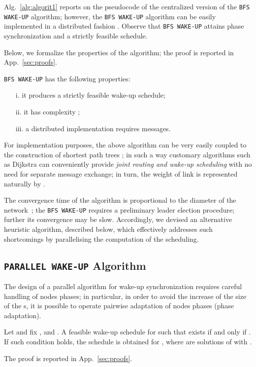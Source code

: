 Alg.~\ref{alg:algorit1} reports on the pseudocode of the centralized version of the {\tt BFS WAKE-UP} algorithm;  
however, the {\tt BFS WAKE-UP} algorithm can be easily implemented in a distributed fashion \cite{Cormen}. Observe that {\tt BFS WAKE-UP} 
attains phase synchronization and a strictly feasible schedule. 

 Below, we formalize the properties of the algorithm; the proof is reported in App.~\ref{sec:proofs}.
\begin{thm}\label{thm:BFS}
{\tt BFS WAKE-UP} has the following properties:
\begin{enumerate}
\item[  i.] it produces a strictly feasible wake-up schedule; 
\item[ ii.] it has complexity ; 
\item[iii.] a distributed implementation requires  messages.
\end{enumerate}
\end{thm}


\begin{rem}
 For implementation purposes, the above algorithm can be very easily coupled to the construction 
of shortest path trees \cite{Cormen}; in such a way customary algorithms such as Dijkstra 
can conveniently provide {\em joint routing and wake-up scheduling} with no need for 
separate message exchange; in turn, the weight of link  is represented naturally by .
\end{rem}

The convergence time of the algorithm is proportional to the diameter of the network~\cite{Cormen};
 the {\tt BFS WAKE-UP} requires a preliminary leader election procedure; further its convergence 
may be slow. Accordingly, we devised an alternative heuristic algorithm, described below, which effectively addresses
such shortcomings by parallelising the computation of the scheduling.


\subsection{{\tt PARALLEL WAKE-UP} Algorithm}\label{sec:parallel}


The design of a parallel algorithm for wake-up synchronization requires careful handling of 
nodes phases; in particular, in order to avoid the increase of the size of the s, it is 
possible to operate pairwise adaptation of nodes phases (phase adaptation).

\begin{lem}\label{prop:adjphase}
Let  and fix ,  and . A feasible wake-up schedule for  
such that  exists if and only if
. If such condition holds, the schedule is obtained for ,  
where  are solutions of  with .
\end{lem}The proof is reported in App.~\ref{sec:proofs}.



